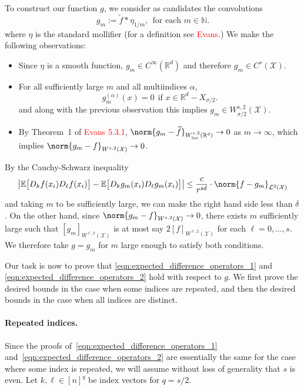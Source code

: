 \documentclass{article}
\newcommand{\Reals}{\mathbb{R}}
\newcommand{\abs}[1]{\left \lvert #1 \right \rvert}
\newcommand{\1}{\mathbf{1}}
\newcommand{\Rd}{\Reals^d}
\newcommand{\Xset}{\mathcal{X}}
\newcommand{\Leb}{\mathcal{L}}
\newcommand{\Ebb}{\mathbb{E}}
\newcommand{\wt}[1]{\widetilde{#1}}
\theoremstyle{alden}
\theoremstyle{aldenthm}
\theoremstyle{definition}
\theoremstyle{remark}
\begin{document}
To construct our function $g$, we consider as candidates the convolutions
\begin{equation}
g_m := \wt{f} \ast \eta_{1/m},~~\textrm{for each $m \in \mathbb{N}$.}
\end{equation}
where $\eta$ is the standard mollifier (for a definition see \textcolor{red}{Evans}.) We make the following observations:
\begin{itemize}
	\item Since $\eta$ is a smooth function, $g_m \in C^{\infty}(\Rd)$ and therefore $g_m \in C^s(\Xset)$. 
	\item For all sufficiently large $m$ and all multiindices $\alpha$,
	\begin{equation*}
	g_m^{(\alpha)}(x) = 0~~\textrm{if $x \in \Reals^d - X_{\sigma/2}$}.
	\end{equation*}
	and along with the previous observation this implies $g_m \in W_{\sigma/2}^{s,2}(\Xset)$. 
	\item By Theorem~1 of \textcolor{red}{Evans 5.3.1}, $\norm{g_m - \wt{f}}_{W_{\mathrm{loc}}^{s,2}(\Rd)} \to 0$ as $m \to \infty$, which implies  $\norm{g_m - f}_{W^{s,2}(\Xset)} \to 0$.
\end{itemize}
By the Cauchy-Schwarz inequality
\begin{equation*}
\abs{\Ebb\bigl[D_kf(x_i) D_{\ell} f(x_i)\bigr] - \Ebb\bigl[D_kg_m(x_i) D_\ell g_m(x_i)\bigr]} \leq \frac{c}{r^{sd}} \cdot \norm{f - g_m}_{\Leb^2(\Xset)}
\end{equation*}
and taking $m$ to be sufficiently large, we can make the right hand side less than $\delta$. On the other hand, since $\norm{g_m - f}_{W^{s,2}(\Xset)} \to 0$, there exists $m$ sufficiently large such that $[g_m]_{W^{\ell,2}(\Xset)}$ is at most say $2 [f]_{W^{\ell,2}(\Xset)}$ for each $\ell = 0,\ldots,s$. We therefore take $g = g_m$ for $m$ large enough to satisfy both conditions. 

Our task is now to prove that \eqref{eqn:expected_difference_operators_1} and \eqref{eqn:expected_difference_operators_2} hold with respect to $g$. We first prove the desired bounds in the case when some indices are repeated, and then the desired bounds in the case when all indices are distinct.

\paragraph{Repeated indices.}

Since the proofs of~\eqref{eqn:expected_difference_operators_1} and~\eqref{eqn:expected_difference_operators_2} are essentially the same for the case where some index is repeated, we will assume without loss of generality that $s$ is even. Let $k,\ell \in [n]^q$ be index vectors for $q = s/2$. 
\end{document}
